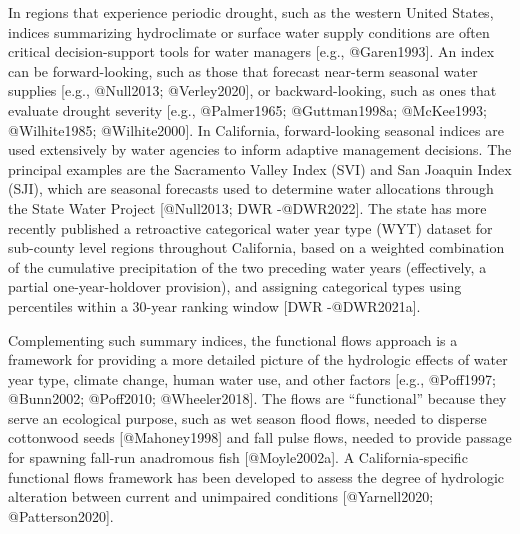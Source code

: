 \documentclass[
]{article}
\begin{document}
In regions that experience periodic drought, such as the western United
States, indices summarizing hydroclimate or surface water supply
conditions are often critical decision-support tools for water managers
{[}e.g., @Garen1993{]}. An index can be forward-looking, such as those
that forecast near-term seasonal water supplies {[}e.g., @Null2013;
@Verley2020{]}, or backward-looking, such as ones that evaluate drought
severity {[}e.g., @Palmer1965; @Guttman1998a; @McKee1993; @Wilhite1985;
@Wilhite2000{]}. In California, forward-looking seasonal indices are
used extensively by water agencies to inform adaptive management
decisions. The principal examples are the Sacramento Valley Index (SVI)
and San Joaquin Index (SJI), which are seasonal forecasts used to
determine water allocations through the State Water Project
{[}@Null2013; DWR -@DWR2022{]}. The state has more recently published a
retroactive categorical water year type (WYT) dataset for sub-county
level regions throughout California, based on a weighted combination of
the cumulative precipitation of the two preceding water years
(effectively, a partial one-year-holdover provision), and assigning
categorical types using percentiles within a 30-year ranking window
{[}DWR -@DWR2021a{]}.

Complementing such summary indices, the functional flows approach is a
framework for providing a more detailed picture of the hydrologic
effects of water year type, climate change, human water use, and other
factors {[}e.g., @Poff1997; @Bunn2002; @Poff2010; @Wheeler2018{]}. The
flows are ``functional'' because they serve an ecological purpose, such
as wet season flood flows, needed to disperse cottonwood seeds
{[}@Mahoney1998{]} and fall pulse flows, needed to provide passage for
spawning fall-run anadromous fish {[}@Moyle2002a{]}. A
California-specific functional flows framework has been developed to
assess the degree of hydrologic alteration between current and
unimpaired conditions {[}@Yarnell2020; @Patterson2020{]}.
\end{document}
